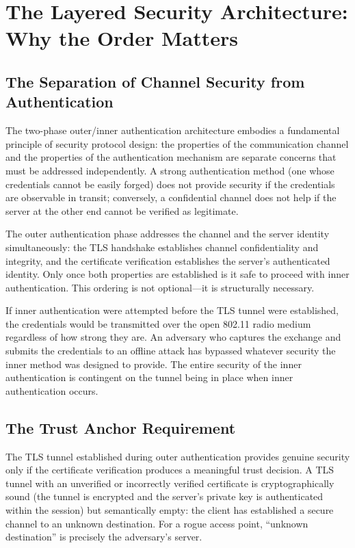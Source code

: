 \documentclass[journal]{IEEEtran}
\begin{document}
\section{The Layered Security Architecture: Why the Order Matters}

\subsection{The Separation of Channel Security from Authentication}

The two-phase outer/inner authentication architecture embodies a fundamental
principle of security protocol design: the properties of the communication channel
and the properties of the authentication mechanism are separate concerns that must
be addressed independently. A strong authentication method (one whose credentials
cannot be easily forged) does not provide security if the credentials are observable
in transit; conversely, a confidential channel does not help if the server at the
other end cannot be verified as legitimate.

The outer authentication phase addresses the channel and the server identity
simultaneously: the TLS handshake establishes channel confidentiality and integrity,
and the certificate verification establishes the server's authenticated identity.
Only once both properties are established is it safe to proceed with inner
authentication. This ordering is not optional---it is structurally necessary.

If inner authentication were attempted before the TLS tunnel were established,
the credentials would be transmitted over the open 802.11 radio medium regardless
of how strong they are. An adversary who captures the exchange and submits the
credentials to an offline attack has bypassed whatever security the inner method
was designed to provide. The entire security of the inner authentication is
contingent on the tunnel being in place when inner authentication occurs.

\subsection{The Trust Anchor Requirement}

The TLS tunnel established during outer authentication provides genuine security
only if the certificate verification produces a meaningful trust decision. A TLS
tunnel with an unverified or incorrectly verified certificate is cryptographically
sound (the tunnel is encrypted and the server's private key is authenticated within
the session) but semantically empty: the client has established a secure channel
to an unknown destination. For a rogue access point, ``unknown destination'' is
precisely the adversary's server.
\end{document}
